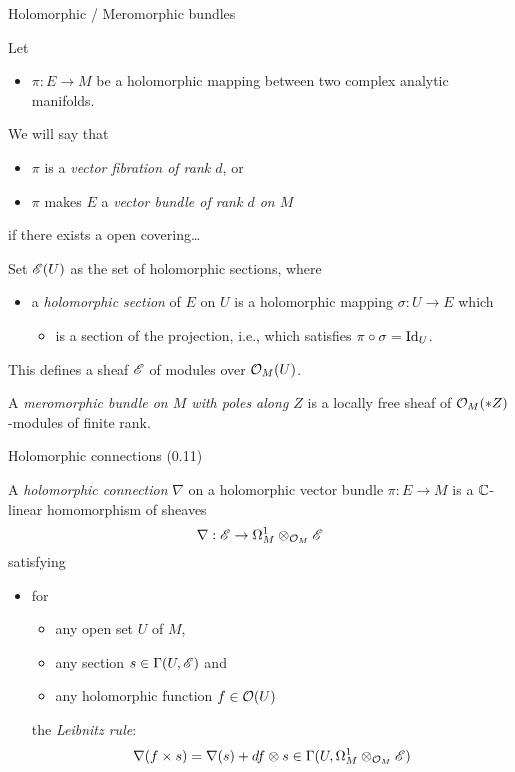 \begin{frame}[t]{Holomorphic / Meromorphic bundles}
  \begin{defn}
    Let
    \begin{itemize}
      \item $\pi:E\to M$ be a holomorphic mapping between two complex analytic
        manifolds.
    \end{itemize}
    We will say that
    \begin{itemize}
      \item $\pi$ is a \emph{vector fibration of rank $d$}, or
      \item $\pi$ makes $E$ a \emph{vector bundle of rank $d$ on $M$}
    \end{itemize}
    if there exists a open covering\dots
  \end{defn}
  Set $\mathscr{E}(U)$ as the set of holomorphic sections, where
  \begin{itemize}
    \item a \emph{holomorphic section} of $E$ on $U$ is a holomorphic mapping
      $\sigma:U\to E$ which
      \begin{itemize}
        \item is a section of the projection, i.e., which satisfies
          $\pi\circ\sigma=\operatorname{Id}_U$.
      \end{itemize}
  \end{itemize}
  This defines a sheaf $\mathscr{E}$ of modules over $\mathcal{O}_M(U)$.
  \begin{prop}
  \end{prop}

  \begin{defn}
    A \emph{meromorphic bundle on $M$ with poles along $Z$} is a locally free
    sheaf of $\mathcal{O}_M(*Z)$-modules of finite rank.
  \end{defn}
\end{frame}

\begin{frame}[t]{Holomorphic connections (0.11)}
  \begin{defn}
    A \emph{holomorphic connection} $\nabla$ on a holomorphic vector bundle
    $\pi:E\to M$ is a $\mathbb{C}$-linear homomorphism of sheaves
    \[
      \nabla:\mathscr{E}\to\Omega_M^1\otimes_{\mathcal{O}_M}\mathscr{E}
    \]
    satisfying
    \begin{itemize}
      \item for
        \begin{itemize}
          \item any open set $U$ of $M$,
          \item any section $s\in\Gamma(U,\mathscr{E})$ and
          \item any holomorphic function $f\in\mathcal{O}(U)$
        \end{itemize}
        the \emph{Leibnitz rule}:
        \[
          \nabla(f\times s)=\nabla(s)+df\otimes
          s\in\Gamma(U,\Omega_M^1\otimes_{\mathcal{O}_M}\mathscr{E})
        \]
    \end{itemize}
  \end{defn}
\end{frame}

